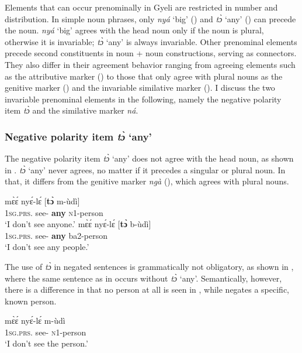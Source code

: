 Elements that can occur prenominally in Gyeli are restricted in number and distribution. In simple noun phrases, only {\itshape nyá} `big' () and {\itshape tɔ̀} `any' () can precede the noun. {\itshape nyá} `big' agrees with the head noun only if the noun is plural, otherwise it is invariable; {\itshape tɔ̀} `any' is always invariable. Other prenominal elements precede second constituents in noun + noun constructions, serving as connectors. They also differ in their agreement behavior ranging from agreeing elements such as the attributive marker () to those that only agree with plural nouns as the genitive marker () and the invariable similative marker (). I discuss the two invariable prenominal elements in the following, namely the negative polarity item {\itshape tɔ̀} and the similative marker {\itshape ná}.


\subsubsection{Negative polarity item {\itshape tɔ̀} `any'}
\label{sec:to}

The negative polarity item {\itshape tɔ̀} `any' does not agree with the head noun, as shown in . {\itshape tɔ̀} `any' never agrees, no matter if it precedes a singular or plural noun. In that, it differs from the genitive marker {\itshape ngà} (), which  agrees with plural nouns.

\ea \label{to}
  \ea  \label{to1}
  \gll    mɛ̀ɛ́ nyɛ́-lɛ́ [{\bfseries tɔ̀} m-ùdì] \\
              1\textsc{sg}.\textsc{prs}.{\NEG} see-{\NEG} {\db}{\bfseries any} \textsc{n}1-person \\
    \trans `I don't see anyone.'
\ex \label{to2}
  \gll    mɛ̀ɛ́ nyɛ́-lɛ́ [{\bfseries tɔ̀} b-ùdì] \\
              1\textsc{sg}.\textsc{prs}.{\NEG} see-{\NEG} {\db}{\bfseries any} ba2-person \\
    \trans `I don't see any people.'
\z
\z

The use of {\itshape tɔ̀} in negated sentences is grammatically not obligatory, as shown in , where the same sentence as in  occurs without {\itshape tɔ̀} `any'. Semantically, however, there is a difference in that no person at all is seen in , while  negates a specific, known person.

\ea \label{to3}
 \gll  mɛ̀ɛ́ nyɛ́-lɛ́ m-ùdì  \\
          1\textsc{sg}.\textsc{prs}.{\NEG} see-{\NEG} \textsc{n}1-person  \\
    \trans `I don't see the person.'
\z


